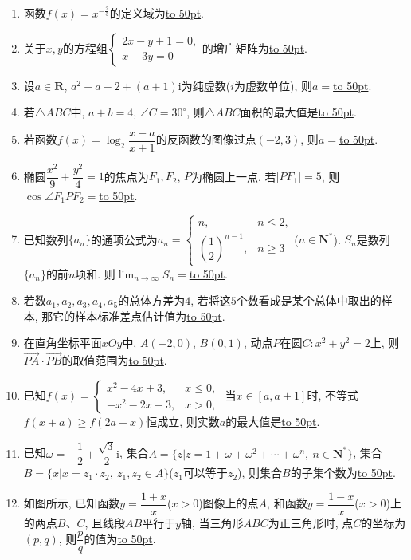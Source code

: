 \documentclass[10pt,a4paper]{article}
\newcommand{\blank}[1]{\underline{\hbox to #1pt{}}}
\begin{document}
\begin{enumerate}[1.]
\item 函数$f(x)=x^{- \frac 23}$的定义域为\blank{50}.
\item 关于$x,y$的方程组$\begin{cases}   2x-y+1=0,  \\x+3y=0  \end{cases}$的增广矩阵为\blank{50}.
\item 设$a\in \mathbf{R}$, $a^2-a-2+(a+1)\mathrm{i}$为纯虚数($i$为虚数单位), 则$a=$\blank{50}.
\item 若$\triangle ABC$中, $a+b=4$, $\angle C=30^\circ$, 则$\triangle  ABC$面积的最大值是\blank{50}.
\item 若函数$f(x)=\log_2\dfrac{x-a}{x+1}$的反函数的图像过点$(-2,3)$, 则$a=$\blank{50}.
\item 椭圆$\dfrac{x^2}9+\dfrac{y^2}4=1$的焦点为$F_1,F_2$, $P$为椭圆上一点, 若$|PF_1|=5$, 则$\cos \angle F_1PF_2=$\blank{50}.
\item 已知数列$\{a_n\}$的通项公式为$a_n=\begin{cases}  n, & n\le 2,  \\ (\dfrac 12)^{n-1}, &  n\ge 3  \end{cases}$($n\in \mathbf{N}^*$). $S_n$是数列$\{a_n\}$的前$n$项和. 则$\displaystyle\lim_{n\to \infty}S_n=$\blank{50}.
\item 若数$a_1,a_2,a_3,a_4,a_5$的总体方差为$4$, 若将这$5$个数看成是某个总体中取出的样本, 那它的样本标准差点估计值为\blank{50}.
\item 在直角坐标平面$xOy$中, $A(-2,0)$, $B(0,1)$, 动点$P$在圆$C:x^2+y^2=2$上, 则$\overrightarrow{PA}\cdot \overrightarrow{PB}$的取值范围为\blank{50}.
\item 已知$f(x)=\begin{cases} x^2-4x+3, & x\le 0, \\ -x^2-2x+3, & x>0, \end{cases}$ 当$x\in [a,a+1]$时, 不等式$f(x+a)\ge f(2a-x)$恒成立, 则实数$a$的最大值是\blank{50}.
\item 已知$\omega =-\dfrac 12+\dfrac{\sqrt 3}2\mathrm{i}$, 集合$A=\{z|z=1+\omega +\omega ^2+\cdots +\omega ^n, \ n\in \mathbf{N}^*\}$,
集合$B=\{x|x=z_1\cdot z_2,\ z_1, z_2\in A\}$($z_1$可以等于$z_2$), 则集合$B$的子集个数为\blank{50}.
\item 如图所示, 已知函数$y=\dfrac{1+x}x$($x>0$)图像上的点$A$, 和函数$y=\dfrac{1-x}x$($x>0$)上的两点$B$、$C$, 且线段$AB$平行于$y$轴, 当三角形$ABC$为正三角形时, 点$C$的坐标为$(p,q)$, 则$\dfrac pq$的值为\blank{50}.
\begin{center}
\begin{tikzpicture}[>=latex]

\end{tikzpicture}
\end{center}
\end{enumerate}
\end{document}
